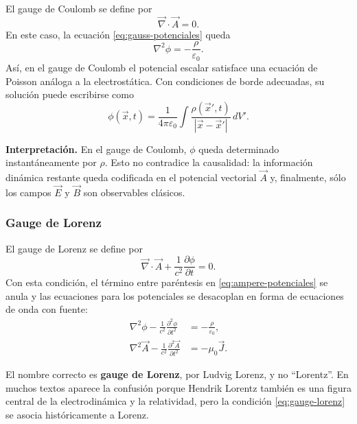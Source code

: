 \documentclass[12pt,a4paper]{article}
\theoremstyle{definition}
\theoremstyle{plain}
\numberwithin{equation}{section}
\theoremstyle{remark}
\newcommand{\E}{\vec{E}}
\newcommand{\B}{\vec{B}}
\newcommand{\J}{\vec{J}}
\begin{document}
El gauge de Coulomb se define por
\begin{equation}
    \boxed{\vec\nabla\cdot\vec A=0.}
    \label{eq:gauge-coulomb}
\end{equation}
En este caso, la ecuación \eqref{eq:gauss-potenciales} queda
\begin{equation}
    \boxed{\nabla^2\phi=-\frac{\rho}{\varepsilon_0}.}
    \label{eq:poisson-phi-coulomb}
\end{equation}
Así, en el gauge de Coulomb el potencial escalar satisface una ecuación de Poisson análoga a la electrostática. Con condiciones de borde adecuadas, su solución puede escribirse como
\begin{equation}
    \phi(\vec x,t)=\frac{1}{4\pi\varepsilon_0}
    \int \frac{\rho(\vec x',t)}{|\vec x-\vec x'|}\,dV'.
    \label{eq:phi-coulomb-integral}
\end{equation}

\begin{cajaidea}
\textbf{Interpretación.} En el gauge de Coulomb, $\phi$ queda determinado instantáneamente por $\rho$. Esto no contradice la causalidad: la información dinámica restante queda codificada en el potencial vectorial $\vec A$ y, finalmente, sólo los campos $\E$ y $\B$ son observables clásicos.
\end{cajaidea}

\subsubsection*{Gauge de Lorenz}

El gauge de Lorenz se define por
\begin{equation}
    \boxed{\vec\nabla\cdot\vec A+\frac{1}{c^2}\frac{\partial\phi}{\partial t}=0.}
    \label{eq:gauge-lorenz}
\end{equation}
Con esta condición, el término entre paréntesis en \eqref{eq:ampere-potenciales} se anula y las ecuaciones para los potenciales se desacoplan en forma de ecuaciones de onda con fuente:
\begin{align}
    \nabla^2\phi-\frac{1}{c^2}\frac{\partial^2\phi}{\partial t^2}
    &=-\frac{\rho}{\varepsilon_0},
    \label{eq:onda-phi-lorenz}\\
    \nabla^2\vec A-\frac{1}{c^2}\frac{\partial^2\vec A}{\partial t^2}
    &=-\mu_0\J.
    \label{eq:onda-A-lorenz}
\end{align}

\begin{cuidado}
El nombre correcto es \textbf{gauge de Lorenz}, por Ludvig Lorenz, y no ``Lorentz''. En muchos textos aparece la confusión porque Hendrik Lorentz también es una figura central de la electrodinámica y la relatividad, pero la condición \eqref{eq:gauge-lorenz} se asocia históricamente a Lorenz.
\end{cuidado}
\end{document}

